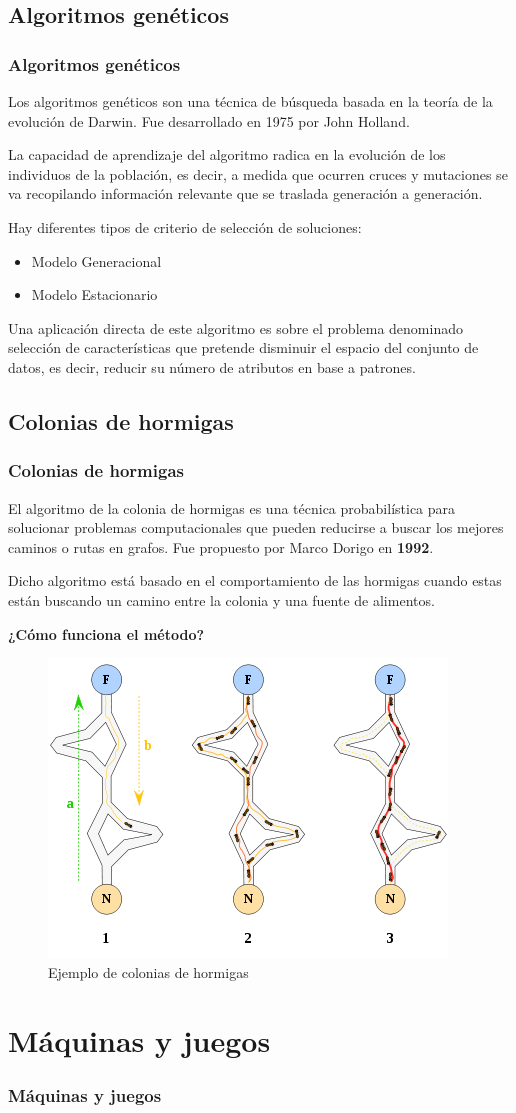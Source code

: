 \documentclass[9pt]{beamer} %
\begin{document}
	\subsection{Algoritmos genéticos}
		\begin{frame}
		\frametitle{Algoritmos genéticos}
				Los algoritmos genéticos son una técnica de búsqueda basada en la teoría de la evolución de Darwin. Fue desarrollado en 1975 por John Holland.\par
				\medskip
		La capacidad de aprendizaje del algoritmo radica en la evolución de los individuos de la población, es decir, a medida que ocurren cruces y mutaciones se va recopilando información relevante que se traslada generación a generación.\par
\medskip		
		Hay diferentes tipos de criterio de selección de soluciones:
		\begin{itemize}
			\item Modelo Generacional
			\item Modelo Estacionario
		\end{itemize}
		Una aplicación directa de este algoritmo es sobre el problema denominado selección de características que pretende disminuir el espacio del conjunto de datos, es decir, reducir su número de atributos en base a patrones.
		\end{frame}

	\subsection{Colonias de hormigas}
		\begin{frame}
		\frametitle{Colonias de hormigas}
		El algoritmo de la colonia de hormigas es una técnica probabilística para solucionar problemas computacionales que pueden reducirse a buscar los mejores caminos o rutas en grafos. Fue propuesto por Marco Dorigo en \textbf{1992}. \par
		\medskip
Dicho algoritmo está basado en el comportamiento de las hormigas cuando estas están buscando un camino entre la colonia y una fuente de alimentos.\par
\medskip
\textbf{¿Cómo funciona el método?}
			\begin{figure}[H]
		\includegraphics[scale=0.35]{Hormigas} 
		\caption{Ejemplo de colonias de hormigas}
	\end{figure}
		\end{frame}

\section{Máquinas y juegos}
	\begin{frame}
	\frametitle{Máquinas y juegos}
	\end{frame}
\end{document}
